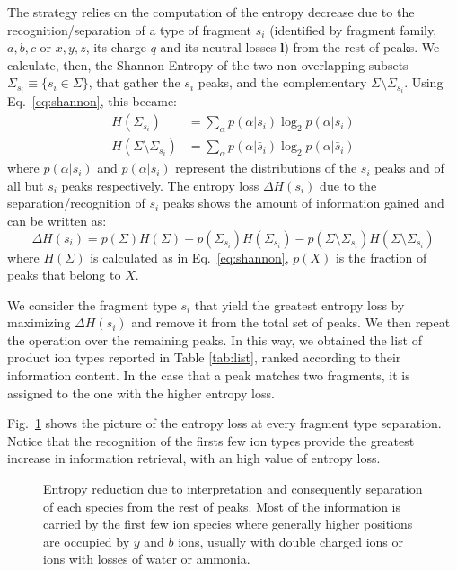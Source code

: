 The strategy relies on the computation of the entropy decrease due
to the recognition/separation of a type of fragment $s_i$ (identified by fragment family,
$a,b,c$ or $x,y,z$, its charge $q$ and its neutral losses $\bm l$) from the rest
of peaks.
We calculate, then, the Shannon Entropy of the two non-overlapping subsets
$\Sigma_{s_i}\equiv\{s_i\in\Sigma\}$, that gather the $s_i$
peaks,
and the complementary $\Sigma\setminus\Sigma_{s_i}$.
Using Eq.~\ref{eq:shannon}, this became:
\begin{align}
H(\Sigma_{s_i})&=
\sum_\alpha p(\alpha|s_i)\log_2 p(\alpha|s_i)\\
H(\Sigma\setminus\Sigma_{s_i})&=
\sum_\alpha p(\alpha|\bar s_i)\log_2 p(\alpha|\bar s_i)
\end{align}
where $p(\alpha|s_i)$ and $p(\alpha|\bar s_i)$ represent the distributions of the
$s_i$ peaks and of all but $s_i$ peaks respectively.
The entropy loss $\Delta H(s_i)$ due to the separation/recognition of
$s_i$ peaks shows the amount of information gained and can be written as:
\begin{equation}
\Delta H (s_i) = p(\Sigma)H(\Sigma)
	-p(\Sigma_{s_i})H(\Sigma_{s_i})
	-p(\Sigma\setminus\Sigma_{s_i})H(\Sigma\setminus\Sigma_{s_i})
\end{equation}
where $H(\Sigma)$ is calculated as in Eq.~\ref{eq:shannon}, $p(X)$ is the
fraction of peaks that belong to $X$.

We consider the fragment type $s_i$ that yield the greatest entropy loss by
maximizing $\Delta H(s_i)$ and remove it from the total set of peaks.
We then repeat the operation over the remaining peaks.
In this way, we obtained the list of product ion types reported in Table \ref{tab:list}, ranked according to their information content.
In the case that a peak matches two fragments, it is assigned to the one with the higher entropy loss.

Fig.~\ref{fig:spec-entropy} shows the picture of the entropy loss at every
fragment type separation.
Notice that the recognition of the firsts few ion types provide the greatest
increase in information retrieval, with an high value of entropy loss.
\begin{figure}
\centering
\resizebox{0.6\textwidth}{!}{\sffamily}
\caption{\label{fig:spec-entropy}
Entropy reduction due to interpretation and consequently separation of each
species from the rest of peaks. Most of the information is carried by the first 
few ion species where generally higher positions are occupied by $y$ and $b$
ions, usually with double charged ions or ions with losses of water or ammonia.}
\end{figure}


